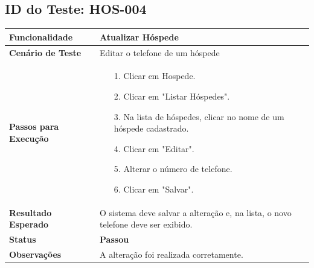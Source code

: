 \documentclass[
	12pt,				%
	openany,			%
	oneside,			%
	a4paper,			%
	english,			%
	french,				%
	spanish,			%
	brazil				%
	]{abntex2}
\begin{document}
\begin{apendicesenv}
	\subsection*{ID do Teste: HOS-004}
	\begin{tabular}{@{} p{5cm} p{11cm} @{}}
		\toprule
		\textbf{Funcionalidade} & Atualizar Hóspede \\
		\midrule
		\textbf{Cenário de Teste} & Editar o telefone de um hóspede \\
		\midrule
		\textbf{Passos para Execução} &
		\begin{itemize} \itemsep0em 
			\item[1.] Clicar em Hospede.
			\item[2.] Clicar em "Listar Hóspedes".
			\item[3.] Na lista de hóspedes, clicar no nome de um hóspede cadastrado.
			\item[4.] Clicar em "Editar".
			\item[5.] Alterar o número de telefone.
			\item[6.] Clicar em "Salvar".
		\end{itemize} \\
		\midrule
		\textbf{Resultado Esperado} & O sistema deve salvar a alteração e, na lista, o novo telefone deve ser exibido. \\
		\midrule
		\textbf{Status} & \textbf{Passou} \\
		\midrule
		\textbf{Observações} &  A alteração foi realizada corretamente. \\
		\bottomrule
	\end{tabular}
	\vspace{1cm}
	

\end{apendicesenv}
\end{document}
